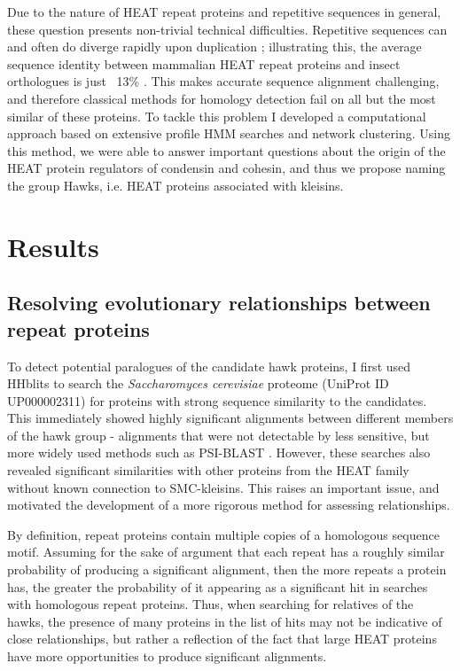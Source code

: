 \documentclass[a4paper,11pt,twoside,openright]{scrbook}
\begin{document}
Due to the nature of HEAT repeat proteins and repetitive sequences in general, these question presents non-trivial technical difficulties. Repetitive sequences can and often do diverge rapidly upon duplication \cite{Persi2016}; illustrating this, the average sequence identity between mammalian HEAT repeat proteins and insect orthologues is just ~13\% \cite{Andrade2001c}. This makes accurate sequence alignment challenging, and therefore classical methods for homology detection fail on all but the most similar of these proteins. To tackle this problem I developed a computational approach based on extensive profile HMM searches and network clustering. Using this method, we were able to answer important questions about the origin of the HEAT protein regulators of condensin and cohesin, and thus we propose naming the group Hawks, i.e. HEAT proteins associated with kleisins.

\section{Results}
\subsection{Resolving evolutionary relationships between repeat proteins}
To detect potential paralogues of the candidate hawk proteins, I first used HHblits \cite{Remmert2011} to search the \textit{Saccharomyces cerevisiae} proteome (UniProt ID UP000002311) for proteins with strong sequence similarity to the candidates. This immediately showed highly significant alignments between different members of the hawk group - alignments that were not detectable by less sensitive, but more widely used methods such as PSI-BLAST \cite{Altschul1997}. However, these searches also revealed significant similarities with other proteins from the HEAT family without known connection to SMC-kleisins. This raises an important issue, and motivated the development of a more rigorous method for assessing relationships.

By definition, repeat proteins contain multiple copies of a homologous sequence motif. Assuming for the sake of argument that each repeat has a roughly similar probability of producing a significant alignment, then the more repeats a protein has, the greater the probability of it appearing as a significant hit in searches with homologous repeat proteins. Thus, when searching for relatives of the hawks, the presence of many proteins in the list of hits may not be indicative of close relationships, but rather a reflection of the fact that large HEAT proteins have more opportunities to produce significant alignments.
\end{document}
